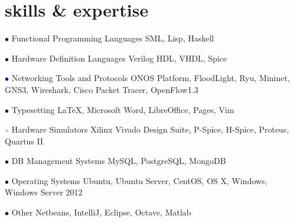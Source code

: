 \documentclass[]{friggeri-cv} %
\begin{document}

\section{skills \& expertise}

\begin{entrylist}

	\entry
	{\textcolor{TextGreen}{$\bullet$}}
	{Functional Programming Languages}
	{}
	{SML, Lisp, Haskell}


	\entry
	{\textcolor{TextOrange}{$\bullet$}}
	{Hardware Definition Languages}
	{}
	{Verilog HDL, VHDL, Spice}


	\entry
	{\textcolor{DarkBlue}{$\bullet$}}
	{Networking Tools and Protocols}
	{}
	{ONOS Platform, FloodLight, Ryu, Mininet, GNS3, Wireshark, Cisco Packet Tracer, OpenFlow1.3}


	\entry
	{\textcolor{Ocean}{$\bullet$}}
	{Typesetting}
	{}
	{\LaTeX, Microsoft Word, LibreOffice, Pages, Vim}


	\entry
	{\textcolor{LightGray}{$\bullet$}}
	{Hardware Simulators}
	{}
	{Xilinx Vivado Design Suite, P-Spice, H-Spice, Proteus, Quartus II}


	\entry
	{\textcolor{TextYellow}{$\bullet$}}
	{DB Management Systems}
	{}
	{MySQL, PostgreSQL, MongoDB}


	\entry
	{\textcolor{TextRed}{$\bullet$}}
	{Operating Systems}
	{}
	{Ubuntu, Ubuntu Server, CentOS, OS X, Windows, Windows Server 2012}


	\entry
	{\textcolor{TextPink}{$\bullet$}}
	{Other}
	{}
	{Netbeans, IntelliJ, Eclipse, Octave, Matlab}



\end{entrylist}
\end{document}
